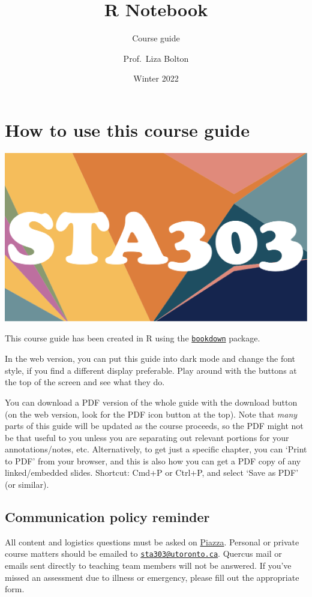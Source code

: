 \documentclass[
  openany]{book}
\title{R Notebook}
\subtitle{Course guide}
\author{Prof.~Liza Bolton}
\date{Winter 2022}
\begin{document}
\maketitle

{
\hypersetup{linkcolor=}
\setcounter{tocdepth}{1}
\tableofcontents
}
\hypertarget{how-to-use-this-course-guide}{%
\chapter{How to use this course guide}\label{how-to-use-this-course-guide}}

\begin{center}\includegraphics[width=0.5\linewidth]{images/quercus-cover} \end{center}

This course guide has been created in R using the \href{https://bookdown.org/}{\texttt{bookdown}} package.

In the web version, you can put this guide into dark mode and change the font style, if you find a different display preferable. Play around with the buttons at the top of the screen and see what they do.

You can download a PDF version of the whole guide with the download button (on the web version, look for the PDF icon button at the top). Note that \emph{many} parts of this guide will be updated as the course proceeds, so the PDF might not be that useful to you unless you are separating out relevant portions for your annotations/notes, etc. Alternatively, to get just a specific chapter, you can `Print to PDF' from your browser, and this is also how you can get a PDF copy of any linked/embedded slides. Shortcut: Cmd+P or Ctrl+P, and select `Save as PDF' (or similar).

\hypertarget{communication-policy-reminder}{%
\section{Communication policy reminder}\label{communication-policy-reminder}}

All content and logistics questions must be asked on \href{https://piazza.com/class/kx47tj4fmy65dg}{Piazza}. Personal or private course matters should be emailed to \href{mailto:sta303@utoronto.ca}{\nolinkurl{sta303@utoronto.ca}}. Quercus mail or emails sent directly to teaching team members will not be answered. If you've missed an assessment due to illness or emergency, please fill out the appropriate form.
\end{document}
